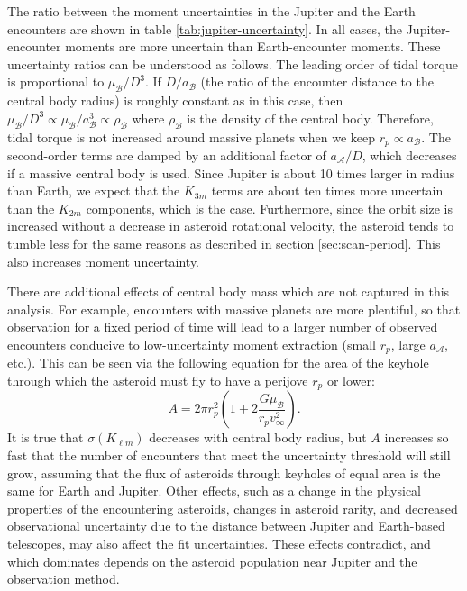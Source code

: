 \documentclass[fleqn,usenatbib]{mnras}
\newcommand{\parens}[1]{\left( #1 \right)}
\begin{document}
The ratio between the moment uncertainties in the Jupiter and the Earth encounters are shown in table \ref{tab:jupiter-uncertainty}. In all cases, the Jupiter-encounter moments are more uncertain than Earth-encounter moments. These uncertainty ratios can be understood as follows. The leading order of tidal torque is proportional to $\mu_\mathcal{B} / D^3$. If $D/a_\mathcal{B}$ (the ratio of the encounter distance to the central body radius) is roughly constant as in this case, then $\mu_\mathcal{B} / D^3 \propto \mu_\mathcal{B} / a_\mathcal{B}^3 \propto \rho_\mathcal{B}$ where $\rho_\mathcal{B}$ is the density of the central body. Therefore, tidal torque is not increased around massive planets when we keep $r_p \propto a_\mathcal{B}$. The second-order terms are damped by an additional factor of $a_\mathcal{A}/D$, which decreases if a massive central body is used. Since Jupiter is about 10 times larger in radius than Earth, we expect that the $K_{3m}$ terms are about ten times more uncertain than the $K_{2m}$ components, which is the case. Furthermore, since the orbit size is increased without a decrease in asteroid rotational velocity, the asteroid tends to tumble less for the same reasons as described in section \ref{sec:scan-period}. This also increases moment uncertainty.

There are additional effects of central body mass which are not captured in this analysis. For example, encounters with massive planets are more plentiful, so that observation for a fixed period of time will lead to a larger number of observed encounters conducive to low-uncertainty moment extraction (small $r_p$, large $a_\mathcal{A}$, etc.). This can be seen via the following equation for the area of the keyhole through which the asteroid must fly to have a perijove $r_p$ or lower:
\begin{equation}
  A = 2 \pi r_p^2 \parens{1+2\frac{G\mu_\mathcal{B}}{r_p v_\infty^2}}.
  \label{eqn:impact-parameter}
\end{equation}
It is true that $\sigma(K_{\ell m})$ decreases with central body radius, but $A$ increases so fast that the number of encounters that meet the uncertainty threshold will still grow, assuming that the flux of asteroids through keyholes of equal area is the same for Earth and Jupiter. Other effects, such as a change in the physical properties of the encountering asteroids, changes in asteroid rarity, and decreased observational uncertainty due to the distance between Jupiter and Earth-based telescopes, may also affect the fit uncertainties. These effects contradict, and which dominates depends on the asteroid population near Jupiter and the observation method.
\end{document}
